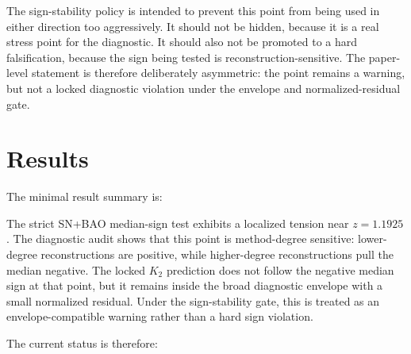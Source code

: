 \documentclass[11pt]{article}
\begin{document}
The sign-stability policy is intended to prevent this point from being used in
either direction too aggressively. It should not be hidden, because it is a
real stress point for the diagnostic. It should also not be promoted to a hard
falsification, because the sign being tested is reconstruction-sensitive. The
paper-level statement is therefore deliberately asymmetric: the point remains a
warning, but not a locked diagnostic violation under the envelope and
normalized-residual gate.

\section{Results}

The minimal result summary is:

\begin{center}
\begingroup
\scriptsize
\setlength{\tabcolsep}{3pt}
\renewcommand{\arraystretch}{1.15}
\endgroup
\end{center}

The strict SN+BAO median-sign test exhibits a localized tension near
$z=1.1925$. The diagnostic audit shows that this point is method-degree
sensitive: lower-degree reconstructions are positive, while higher-degree
reconstructions pull the median negative. The locked $K_2$ prediction does not
follow the negative median sign at that point, but it remains inside the broad
diagnostic envelope with a small normalized residual. Under the sign-stability
gate, this is treated as an envelope-compatible warning rather than a hard
sign violation.

The current status is therefore:
\end{document}
